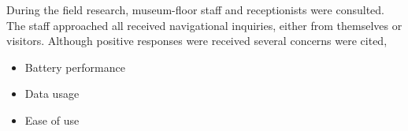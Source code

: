 During the field research, museum-floor staff and receptionists were consulted. The staff approached all received navigational inquiries, either from themselves or visitors. Although positive responses were received several concerns were cited,
\begin{itemize}
    \item Battery performance
    \item Data usage
    \item Ease of use
\end{itemize}
